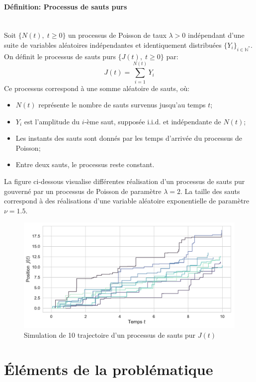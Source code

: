 \paragraph{Définition: Processus de sauts purs}\mbox{}\\
Soit $\{N(t),\;t \geq 0\}$ un processus de Poisson de taux $\lambda > 0$ indépendant d'une suite de variables aléatoires indépendantes et identiquement distribuées $\{Y_i\}_{i \in \mathbb{N}^*}$. On définit le processus de sauts purs $\{J(t),\;t \geq 0\}$ par:
\[
J(t) = \sum_{i=1}^{N(t)} Y_i
\]
Ce processus correspond à une somme aléatoire de sauts, où:
\begin{itemize}
    \item $N(t)$ représente le nombre de sauts survenus jusqu'au temps $t$;
    \item $Y_i$ est l'amplitude du $i$-ème saut, supposée i.i.d. et indépendante de $N(t)$;
    \item Les instants des sauts sont donnés par les temps d'arrivée du processus de Poisson;
    \item Entre deux sauts, le processus reste constant.
\end{itemize}
La figure ci-dessous visualise différentes réalisation d'un processus de sauts pur gouverné par un processus de Poisson de paramètre $\lambda=2$. La taille des sauts correspond à des réalisations d'une variable aléatoire exponentielle de paramètre $\nu=1.5$.
\begin{figure}[htb]
    \centering
    \includegraphics[width=\linewidth]{img/intro/path_jump.pdf}
    \caption{Simulation de 10 trajectoire d'un processus de sauts pur $J(t)$}\label{fig:TrajJump}
\end{figure}
\FloatBarrier\clearpage

\section{Éléments de la problématique}  %


